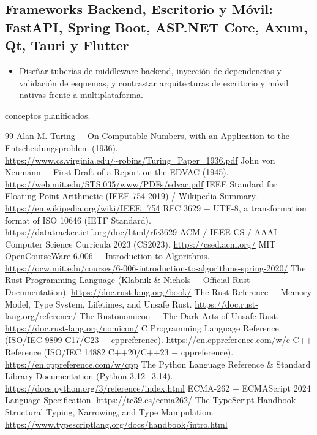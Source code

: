 \documentclass{book}
\begin{document}
\subsection*{\checkmark Frameworks Backend, Escritorio y Móvil: FastAPI, Spring Boot, ASP.NET Core, Axum, Qt, Tauri y Flutter}
\begin{itemize}
\item Diseñar tuberías de middleware backend, inyección de dependencias y validación de esquemas, y contrastar arquitecturas de escritorio y móvil nativas frente a multiplataforma.
\end{itemize}
 conceptos planificados.
\backmatter
\begin{thebibliography}{99}
 Alan M. Turing \(-\) On Computable Numbers, with an Application to the Entscheidungsproblem (1936). \url{https://www.cs.virginia.edu/~robins/Turing_Paper_1936.pdf}
 John von Neumann \(-\) First Draft of a Report on the EDVAC (1945). \url{https://web.mit.edu/STS.035/www/PDFs/edvac.pdf}
 IEEE Standard for Floating-Point Arithmetic (IEEE 754-2019) / Wikipedia Summary. \url{https://en.wikipedia.org/wiki/IEEE_754}
 RFC 3629 \(-\) UTF-8, a transformation format of ISO 10646 (IETF Standard). \url{https://datatracker.ietf.org/doc/html/rfc3629}
 ACM / IEEE-CS / AAAI Computer Science Curricula 2023 (CS2023). \url{https://csed.acm.org/}
 MIT OpenCourseWare 6.006 \(-\) Introduction to Algorithms. \url{https://ocw.mit.edu/courses/6-006-introduction-to-algorithms-spring-2020/}
 The Rust Programming Language (Klabnik \& Nichols \(-\) Official Rust Documentation). \url{https://doc.rust-lang.org/book/}
 The Rust Reference \(-\) Memory Model, Type System, Lifetimes, and Unsafe Rust. \url{https://doc.rust-lang.org/reference/}
 The Rustonomicon \(-\) The Dark Arts of Unsafe Rust. \url{https://doc.rust-lang.org/nomicon/}
 C Programming Language Reference (ISO/IEC 9899 C17/C23 \(-\) cppreference). \url{https://en.cppreference.com/w/c}
 C++ Reference (ISO/IEC 14882 C++20/C++23 \(-\) cppreference). \url{https://en.cppreference.com/w/cpp}
 The Python Language Reference \& Standard Library Documentation (Python 3.12\(-\)3.14). \url{https://docs.python.org/3/reference/index.html}
 ECMA-262 \(-\) ECMAScript 2024 Language Specification. \url{https://tc39.es/ecma262/}
 The TypeScript Handbook \(-\) Structural Typing, Narrowing, and Type Manipulation. \url{https://www.typescriptlang.org/docs/handbook/intro.html}

\end{thebibliography}
\end{document}
